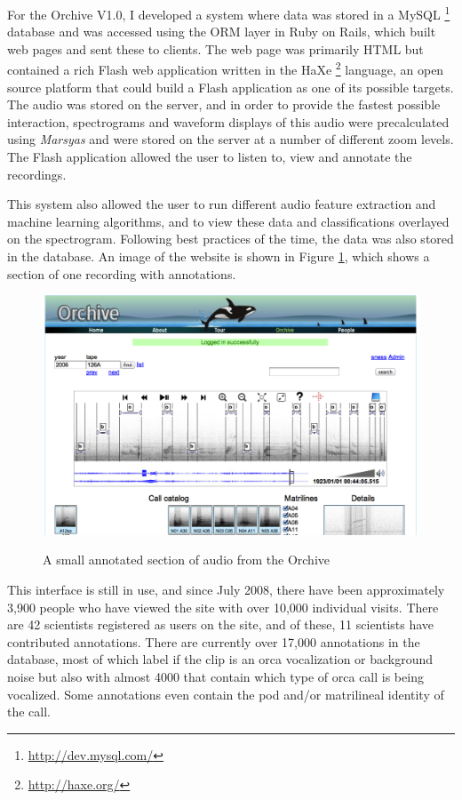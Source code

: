 For the Orchive V1.0, I developed a system where data was stored in a
MySQL \footnote{\url{http://dev.mysql.com/}} database and was accessed
using the ORM layer in Ruby on Rails, which built web pages and sent
these to clients.  The web page was primarily HTML but contained a
rich Flash web application written in the
HaXe \footnote{\url{http://haxe.org/}} language, an open source
platform that could build a Flash application as one of its possible
targets.  The audio was stored on the server, and in order to provide
the fastest possible interaction, spectrograms and waveform displays
of this audio were precalculated using
\textit{Marsyas}\cite{tzanetakis2008marsyas} and were stored on the server at a
number of different zoom levels.  The Flash application allowed the
user to listen to, view and annotate the recordings.

This system also allowed the user to run different audio feature
extraction and machine learning algorithms, and to view these data and
classifications overlayed on the spectrogram.  Following best
practices of the time, the data was also stored in the database.  An
image of the website is shown in Figure \ref{fig:dm_orchive}, which
shows a section of one recording with annotations.

\begin{figure}[t]
\centering
\includegraphics[width=\columnwidth]{figures/dm_orchive}
\label{fig:dm_orchive}
\caption{A small annotated section of audio from the Orchive}
\end{figure}

This interface is still in use, and since July 2008, there have been
approximately 3,900 people who have viewed the site with over 10,000
individual visits.  There are 42 scientists registered as users on the
site, and of these, 11 scientists have contributed annotations.  There
are currently over 17,000 annotations in the database, most of which
label if the clip is an orca vocalization or background noise but also
with almost 4000 that contain which type of orca call is being
vocalized.  Some annotations even contain the pod and/or matrilineal
identity of the call.

